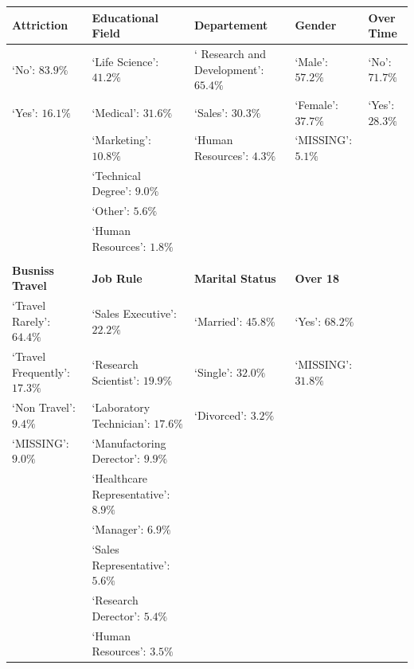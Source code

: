 \documentclass[a4paper,9pt]{article}
\begin{document}
\begin{center}
\begin{table}\footnotesize
\begin{tabular}{lllll}
\toprule
\bfseries Attriction &\bfseries  Educational Field & \bfseries Departement &\bfseries  Gender & \bfseries Over Time\\
\hline
\hline
\rowcolor[gray]{0.9}
`No': $83.9\%$ &`Life Science': $41.2\%$ &` Research and Development': $65.4\%$ & `Male': $57.2\%$ & `No': $71.7\%$ \\
`Yes': $16.1\%$ &`Medical': $31.6\%$ &`Sales': $30.3\%$ & `Female': $37.7\%$ & `Yes': $28.3\%$ \\
\rowcolor[gray]{0.9}
                          &`Marketing': $10.8\%$ &`Human Resources': $4.3\%$ & `MISSING': $5.1\%$ &  \\
                          &`Technical Degree': $9.0\%$ &                                   &                                 &  \\
\rowcolor[gray]{0.9}
                          &`Other': $5.6\%$ &                                   &                                 &  \\
                          &`Human Resources': $1.8\%$ &                                   &                                 &  \\
&&&&\\
\hline
\bfseries Busniss Travel &\bfseries  Job Rule& \bfseries Marital Status &\bfseries  Over 18 & \\
\hline
\hline
\rowcolor[gray]{0.9}
`Travel Rarely': $64.4\%$ &`Sales Executive': $22.2\%$ &`Married': $45.8\%$ & `Yes': $68.2\%$ &\\
`Travel Frequently': $17.3\%$ &`Research Scientist': $19.9\%$ &`Single': $32.0\%$ & `MISSING': $31.8\%$ &\\
\rowcolor[gray]{0.9}
`Non Travel': $9.4\%$ &`Laboratory Technician': $17.6\%$ &`Divorced': $3.2\%$ &       &      \\
`MISSING': $9.0\%$ &`Manufactoring Derector': $9.9\%$ &     &       &      \\
\rowcolor[gray]{0.9}
                               &`Healthcare Representative': $8.9\%$ &     &       &      \\
                               &`Manager': $6.9\%$ &     &       &      \\
\rowcolor[gray]{0.9}
                               &`Sales Representative': $5.6\%$ &     &       &      \\
                               &`Research Derector': $5.4\%$ &     &       &      \\
\rowcolor[gray]{0.9}
                               &`Human Resources': $3.5\%$ &     &       &      \\
\bottomrule
\end{tabular}
\end{table}
\end{center}
\end{document}
